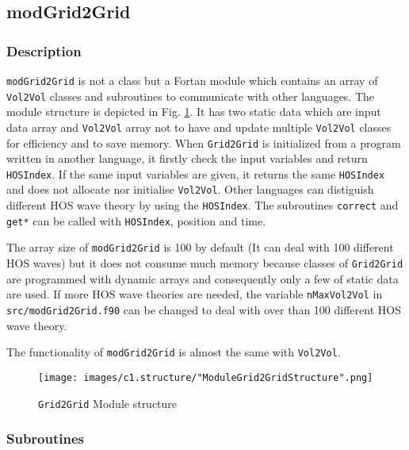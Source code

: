 \pagebreak
\subsection{modGrid2Grid}

\subsubsection{Description}

\texttt{modGrid2Grid} is not a class but a Fortan module which contains an array of \texttt{Vol2Vol} classes and subroutines to communicate with other languages. The module structure is depicted in Fig. \ref{fig:modGrid2GridStructure}. It has two static data which are input data array and \texttt{Vol2Vol} array not to have and update multiple \texttt{Vol2Vol} classes for efficiency and to save memory. When \texttt{Grid2Grid} is initialized from a program written in another language, it firstly check the input variables and return \texttt{HOSIndex}. If the same input variables are given, it returns the same \texttt{HOSIndex} and does not allocate nor initialise \texttt{Vol2Vol}. Other languages can distiguish different HOS wave theory by using the \texttt{HOSIndex}.
The subroutines \texttt{correct} and \texttt{get*} can be called with \texttt{HOSIndex}, position and time. 

The array size of \texttt{modGrid2Grid} is 100 by default (It can deal with 100 different HOS waves) but it does not consume much memory because classes of \texttt{Grid2Grid} are programmed with dynamic arrays and consequently only a few of static data are used. If more HOS wave theories are needed, the variable \texttt{nMaxVol2Vol} in \texttt{src/modGrid2Grid.f90} can be changed to deal with over than 100 different HOS wave theory. 

The functionality of \texttt{modGrid2Grid} is almost the same with \texttt{Vol2Vol}. 

\vspace{0.5cm}

{
	\begin{figure} [H]
		\centering
		\texttt{[image: images/c1.structure/"ModuleGrid2GridStructure".png]}
		\vspace{0.5cm}
		\caption{\texttt{Grid2Grid} Module structure}
		\label{fig:modGrid2GridStructure}
	\end{figure}
}

\pagebreak
\subsubsection{Subroutines}	

